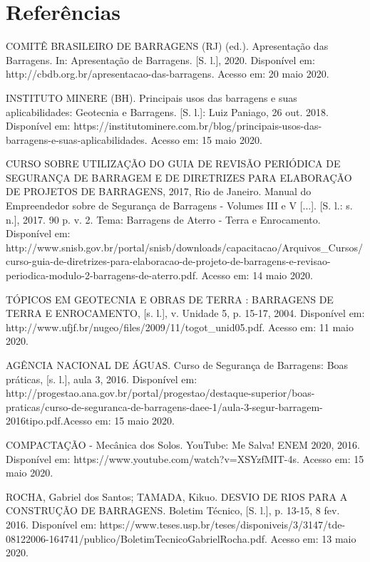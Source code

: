 \section{Referências}

COMITÊ BRASILEIRO DE BARRAGENS (RJ) (ed.). Apresentação das Barragens. In: Apresentação de Barragens. [S. l.], 2020. Disponível em: http://cbdb.org.br/apresentacao-das-barragens. Acesso em: 20 maio 2020.

\vspace{.5cm}
\noindent INSTITUTO MINERE (BH). Principais usos das barragens e suas aplicabilidades: Geotecnia e Barragens. [S. l.]: Luiz Paniago, 26 out. 2018. Disponível em: https://institutominere.com.br/blog/principais-usos-das-barragens-e-suas-aplicabilidades. Acesso em: 15 maio 2020.

\vspace{.5cm}
\noindent CURSO SOBRE UTILIZAÇÃO DO GUIA DE REVISÃO PERIÓDICA DE SEGURANÇA DE BARRAGEM E DE DIRETRIZES PARA ELABORAÇÃO DE PROJETOS DE BARRAGENS, 2017, Rio de Janeiro. Manual do Empreendedor sobre de Segurança de Barragens - Volumes III e V [...]. [S. l.: s. n.], 2017. 90 p. v. 2. Tema: Barragens de Aterro - Terra e Enrocamento. Disponível em: http://www.snisb.gov.br/portal/snisb/downloads/capacitacao/Arquivos\_Cursos/curso-guia-de-diretrizes-para-elaboracao-de-projeto-de-barragens-e-revisao-periodi\newline ca-modulo-2-barragens-de-aterro.pdf. Acesso em: 14 maio 2020.

\vspace{.5cm}
\noindent\uppercase{Tópicos em Geotecnia e Obras de Terra} : BARRAGENS DE TERRA E ENROCAMENTO, [s. l.], v. Unidade 5, p. 15-17, 2004. Disponível em: http://www.ufjf.br/nugeo/files/2009/11/togot\_unid05.pdf. Acesso em: 11 maio 2020.

\vspace{.5cm}
\noindent\uppercase{Agência Nacional de Águas}. Curso de Segurança de Barragens: Boas práticas, [s. l.], aula 3, 2016. Disponível em: http://progestao.ana.gov.br/portal/progestao/destaque-superior/\newline boas-praticas/curso-de-seguranca-de-barragens-daee-1/aula-3-segur-barragem-2016tipo.pdf.\newline Acesso em: 15 maio 2020.

\vspace{.5cm}
\noindent COMPACTAÇÃO - Mecânica dos Solos. YouTube: Me Salva! ENEM 2020, 2016. Disponível em: https://www.youtube.com/watch?v=XSYzfMIT-4s. Acesso em: 15 maio 2020.

\vspace{.5cm}
\noindent ROCHA, Gabriel dos Santos; TAMADA, Kikuo. DESVIO DE RIOS PARA A CONSTRUÇÃO DE BARRAGENS. Boletim Técnico, [S. l.], p. 13-15, 8 fev. 2016. Disponível em: https://www.teses.usp.br/teses/disponiveis/3/3147/tde-08122006-164741/publico/BoletimTec\newline nicoGabrielRocha.pdf. Acesso em: 13 maio 2020.